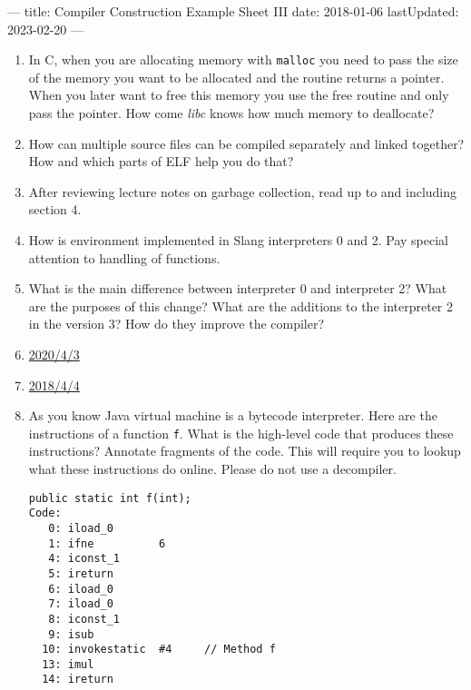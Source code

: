 ---
title: Compiler Construction Example Sheet III
date: 2018-01-06
lastUpdated: 2023-02-20
---



\begin{enumerate}
  \item In \textsc{C}, when you are allocating memory with \texttt{malloc} you
    need to pass the size of the memory you want to be allocated and the
    routine returns a pointer. When you later want to free this memory you use
    the free routine and only pass the pointer. How come \emph{libc} knows how
    much memory to deallocate?

  \item How can multiple source files can be compiled separately and linked
    together? How and which parts of ELF help you do that?

  \item After reviewing lecture notes on garbage collection, read
    \citet{unified} up to and including section 4.

  \item How is environment implemented in Slang interpreters 0 and 2. Pay
    special attention to handling of functions.

  \item What is the main difference between interpreter 0 and interpreter 2?
    What are the purposes of this change? What are the additions to the
    interpreter 2 in the version 3? How do they improve the compiler?

  \item \href{https://www.cl.cam.ac.uk/teaching/exams/pastpapers/y2020p4q3.pdf}{2020/4/3}

  \item \href{https://www.cl.cam.ac.uk/teaching/exams/pastpapers/y2018p4q4.pdf}{2018/4/4}

  \item As you know Java virtual machine is a bytecode interpreter. Here are
    the instructions of a function \texttt{f}. What is the high-level code that
    produces these instructions? Annotate fragments of the code. This will
    require you to lookup what these instructions do online. Please do not use
    a decompiler.

    \begin{verbatim}
public static int f(int);
Code:
   0: iload_0
   1: ifne          6
   4: iconst_1
   5: ireturn
   6: iload_0
   7: iload_0
   8: iconst_1
   9: isub
  10: invokestatic  #4     // Method f
  13: imul
  14: ireturn
    \end{verbatim}


\end{enumerate}
